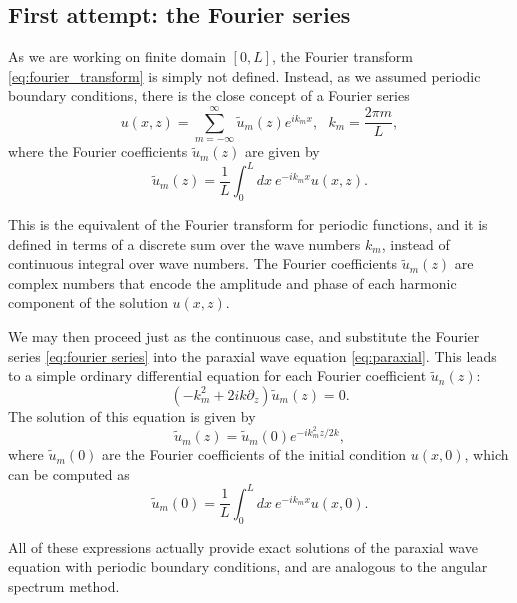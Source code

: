 \documentclass[a4paper,10pt]{report}
\begin{document}
\subsection{First attempt: the Fourier series}

As we are working on finite domain $[0,L]$, the Fourier transform \eqref{eq:fourier_transform} is simply not defined. Instead, as we assumed periodic boundary conditions, there is the close concept of a Fourier series
\begin{equation}
    \label{eq:fourier series}
    u(x,z) = \sum_{m=-\infty}^{\infty} \tilde{u}_m(z) e^{i k_m x}, \ \ \ k_m = \frac{2\pi m}{L},
\end{equation}
where the Fourier coefficients $\tilde{u}_m(z)$ are given by
\begin{equation}
    \tilde{u}_m(z) = \frac{1}{L} \int_0^L dx \ e^{-i k_m x} u(x,z).
\end{equation}

This is the equivalent of the Fourier transform for periodic functions, and it is defined in terms of a discrete sum over the wave numbers $k_m$, instead of continuous integral over wave numbers. The Fourier coefficients $\tilde{u}_m(z)$ are complex numbers that encode the amplitude and phase of each harmonic component of the solution $u(x,z)$.

We may then proceed just as the continuous case, and substitute the Fourier series \eqref{eq:fourier series} into the paraxial wave equation \eqref{eq:paraxial}. This leads to a simple ordinary differential equation for each Fourier coefficient $\tilde{u}_n(z)$:
\begin{equation}
    \left( -k_m^2 + 2ik \partial_z \right) \tilde{u}_m(z) = 0.
\end{equation}
The solution of this equation is given by
\begin{equation}
    \label{eq:solution_paraxial_fourier_discrete}
    \tilde{u}_m(z) = \tilde{u}_m(0) e^{-i k_m^2 z / 2k},
\end{equation}
where $\tilde{u}_m(0)$ are the Fourier coefficients of the initial condition $u(x,0)$, which can be computed as
\begin{equation}
    \tilde{u}_m(0) = \frac{1}{L} \int_0^L dx \ e^{-i k_m x} u(x,0).
\end{equation}

All of these expressions actually provide exact solutions of the paraxial wave equation with periodic boundary conditions, and are analogous to the angular spectrum method. 
\end{document}
